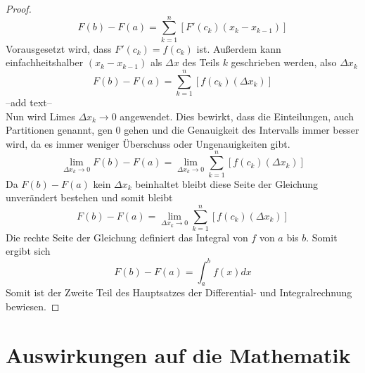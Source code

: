 \documentclass[fontsize=12pt,paper=a4,DIV12,cleardoublepage=empty, 
liststotoc,idxtotoc,bibtotoc]{article}
\theoremstyle{plain}
\theoremstyle{definition}
\begin{document}
\begin{proof}
\begin{equation*}
		F(b)-F(a)=\sum_{k=1}^{n} [F'(c_k)(x_k-x_{k-1})]
	\end{equation*}
	Vorausgesetzt wird, dass $F'(c_k)=f(c_k)$ ist. Außerdem kann einfachheitshalber $(x_k-x_{k-1})$ als $\Delta x$ des Teils $k$ geschrieben werden, also $\Delta x_k$
	\begin{equation}
		F(b)-F(a)=\sum_{k=1}^{n} [f(c_k)(\Delta x_k)]
	\end{equation}
	--add text--\\
	Nun wird Limes $\Delta x_k \to 0$ angewendet. Dies bewirkt, dass die Einteilungen, auch Partitionen genannt, gen 0 gehen und die Genauigkeit des Intervalls immer besser wird, da es immer weniger Überschuss oder Ungenauigkeiten gibt.
	\begin{equation*}
		\lim \limits_{\Delta x_k \to 0} F(b)-F(a)=\lim \limits_{\Delta x_k \to 0} \sum_{k=1}^{n} [f(c_k)(\Delta x_k)]
	\end{equation*}
	Da $F(b)-F(a)$ kein $\Delta x_k$ beinhaltet bleibt diese Seite der Gleichung unverändert bestehen und somit bleibt
	\begin{equation*}
		F(b)-F(a)=\lim \limits_{\Delta x_k \to 0} \sum_{k=1}^{n} [f(c_k)(\Delta x_k)]
	\end{equation*}
	Die rechte Seite der Gleichung definiert das Integral von $f$ von $a$ bis $b$. Somit ergibt sich
	\begin{equation*}
		F(b)-F(a)=\int_{a}^{b}f(x)dx
	\end{equation*}
	Somit ist der Zweite Teil des Hauptsatzes der Differential- und Integralrechnung bewiesen.
	\end{proof}
	
	
	
	\section{Auswirkungen auf die Mathematik}
	
	
	
	\printbibliography[title=Literaturverzeichnis]
\end{document}
